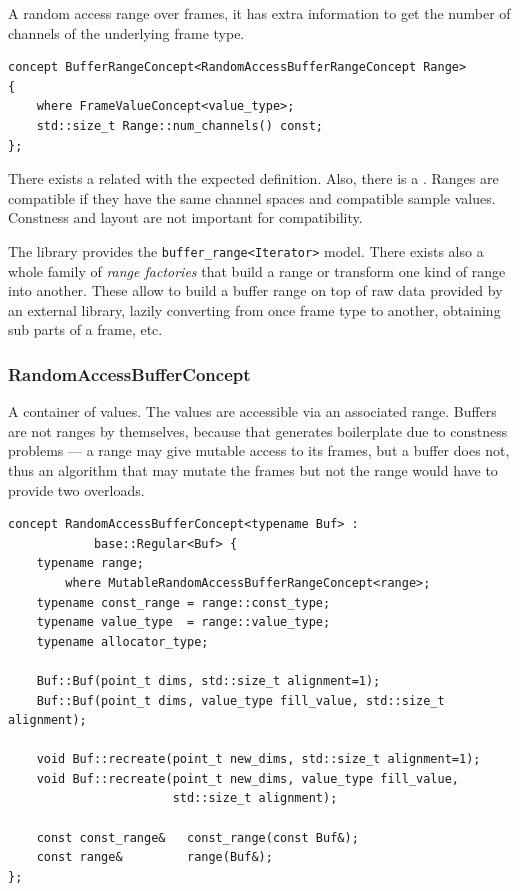 A random access range over frames, it has extra information to get the
number of channels of the underlying frame type.

\begin{lstlisting}
concept BufferRangeConcept<RandomAccessBufferRangeConcept Range> 
{
    where FrameValueConcept<value_type>;
    std::size_t Range::num_channels() const;
};
\end{lstlisting}

There exists a related  with the
expected definition. Also, there is a
. Ranges are compatible if they have
the same channel spaces and compatible sample values. Constness and
layout are not important for compatibility.

The library provides the
\texttt{buffer\_range<Iterator>} model. There exists also a whole
family of \emph{range factories} that build a range or transform one
kind of range into another. These allow to build a buffer range on
top of raw data provided by an external library, lazily converting
from once frame type to another, obtaining sub parts of a frame, etc.

\subsubsection{RandomAccessBufferConcept}

A container of values. The values are accessible via an associated
range. Buffers are not ranges by themselves, because that generates
boilerplate due to constness problems --- a  range may
give mutable access to its frames, but a  buffer does
not, thus an algorithm that may mutate the frames but not the range
would have to provide two overloads.

\begin{lstlisting}
concept RandomAccessBufferConcept<typename Buf> : 
            base::Regular<Buf> {
    typename range; 
        where MutableRandomAccessBufferRangeConcept<range>;
    typename const_range = range::const_type;
    typename value_type  = range::value_type;
    typename allocator_type;

    Buf::Buf(point_t dims, std::size_t alignment=1);
    Buf::Buf(point_t dims, value_type fill_value, std::size_t alignment);
    
    void Buf::recreate(point_t new_dims, std::size_t alignment=1);
    void Buf::recreate(point_t new_dims, value_type fill_value,
                       std::size_t alignment);
    
    const const_range&   const_range(const Buf&);
    const range&         range(Buf&);
};
\end{lstlisting}

